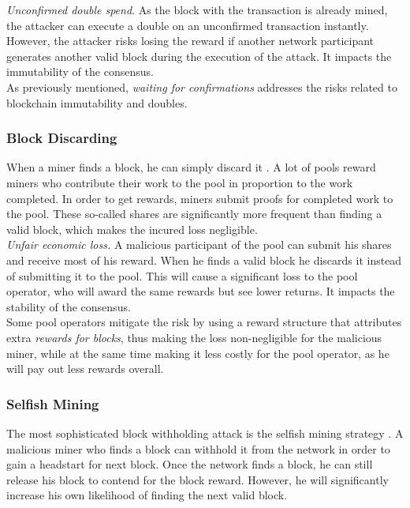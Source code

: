 \documentclass[12pt,a4paper]{article}
\begin{document}
\textit{Unconfirmed double spend}. As the block with the \gls{transaction} is already mined, the attacker can execute a \gls{double} on an unconfirmed \gls{transaction} instantly. However, the attacker risks losing the \gls{reward} if another network participant generates another valid block during the execution of the attack. It impacts the immutability of the \gls{consensus}.\\

As previously mentioned, \textit{waiting for confirmations} addresses the risks related to blockchain immutability and \glspl{double}.\\

\subsubsection{Block Discarding}

When a miner finds a block, he can simply discard it \cite{less}. A lot of \glspl{pool} reward \glspl{miner} who contribute their work to the \gls{pool} in proportion to the work completed. In order to get rewards, \glspl{miner} submit proofs for completed work to the \gls{pool}. These so-called shares are significantly more frequent than finding a valid \gls{block}, which makes the incured loss negligible.\\

\textit{Unfair economic loss.} A malicious participant of the \gls{pool} can submit his shares and receive most of his \gls{reward}. When he finds a valid \gls{block} he discards it instead of submitting it to the \gls{pool}. This will cause a significant loss to the pool operator, who will award the same rewards but see lower returns. It impacts the stability of the \gls{consensus}.\\

Some pool operators mitigate the risk by using a reward structure that attributes extra \textit{rewards for blocks}, thus making the loss non-negligible for the malicious miner, while at the same time making it less costly for the \gls{pool} operator, as he will pay out less rewards overall.\\

\subsubsection{Selfish Mining}

The most sophisticated block withholding attack is the selfish mining strategy \cite{selfish}. A malicious miner who finds a block can withhold it from the network in order to gain a headstart for next block. Once the network finds a block, he can still release his block to contend for the block reward. However, he will significantly increase his own likelihood of finding the next valid block.\\
\end{document}
